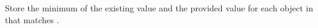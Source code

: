 Store the minimum of the existing value and the provided value for each
object in  that matches .


